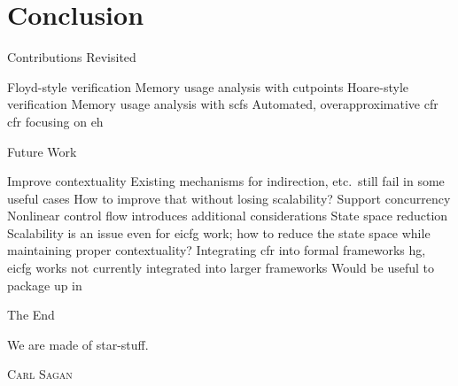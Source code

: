\section{Conclusion}

\begin{frame}{Contributions Revisited}
  \begin{outline}
    \1 Floyd-style verification
      \2 Memory usage analysis with \alert{cutpoints}
    \1 Hoare-style verification
      \2 Memory usage analysis with \glspl{scf}
    \1 
      \2 Automated, \alert{overapproximative} \gls{cfr}
    \1 
      \2 \Gls{cfr} focusing on \gls{eh}
  \end{outline}
\end{frame}

\begin{frame}{Future Work}
  \begin{outline}
    \1 Improve contextuality
      \2 Existing mechanisms for indirection, etc.\ still fail in some useful cases
      \2 How to improve that without losing scalability?
    \1 Support concurrency
      \2 Nonlinear control flow introduces additional considerations
    \1 State space reduction
      \2 Scalability is an issue even for \gls{eicfg} work; how to reduce the state space while maintaining proper contextuality?
    \1 Integrating \gls{cfr} into formal frameworks
      \2 \Gls{hg}, \gls{eicfg} works not currently integrated into larger frameworks
      \2 Would be useful to package up in 
  \end{outline}
\end{frame}

\begin{frame}{The End}
  \centering
  \epigraph{We are made of star-stuff.}{\textsc{Carl Sagan}}
\end{frame}
